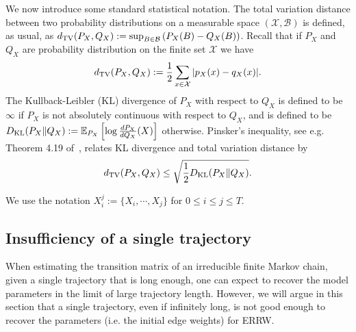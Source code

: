 \documentclass[a4paper, 11pt]{article}
\newcommand{\dkl}{D_{\textnormal{KL}}}
\newcommand{\dtv}{d_{\textnormal{TV}}}
\begin{document}
We now introduce some standard statistical notation.
The total variation distance between two probability 
distributions on a measurable space $(\mathcal{X}, \mathcal{B})$
is defined, as usual, as 
$\dtv(P_X, Q_X) := \sup_{B \in \mathcal{B}} \left( P_X(B) - Q_X(B) \right)$.
Recall that if $P_X$ and $Q_X$ are probability distribution
on the finite set $\mathcal{X}$ we have
\[\dtv(P_X, Q_X) := \frac{1}{2}\sum_{x \in \mathcal{X}} |p_X(x)-q_X(x)|.\]
The Kullback-Leibler (KL) divergence of $P_X$ with respect
to $Q_X$ is defined to be $\infty$ if $P_X$ is not
absolutely continuous with respect to $Q_X$, and is defined
to be $\dkl(P_X \| Q_X) := \mathbb{E}_{P_X} \left[ \log \frac{dP_X}{dQ_X} (X) \right]$ otherwise.
Pinsker's inequality, see e.g. Theorem 4.19 of~\cite{BLM2013}, relates KL divergence and total variation distance by 
\[
\dtv(P_X,Q_X)\leq \sqrt{\frac{1}{2}\dkl(P_X\|Q_X)}.
\]

We use the notation $X_i^j:=\{X_i,\cdots, X_j\}$ for $0\leq i\leq j\leq T$.


\subsection{Insufficiency of a single trajectory}

When estimating the transition matrix of an irreducible finite Markov chain, given a single trajectory that is long enough, one can expect to recover the model parameters
in the limit of large trajectory length. 
However, we will argue in this section that a single trajectory, even if infinitely long, is not good enough 
to recover the parameters (i.e. the initial edge weights) for ERRW. 
\end{document}
